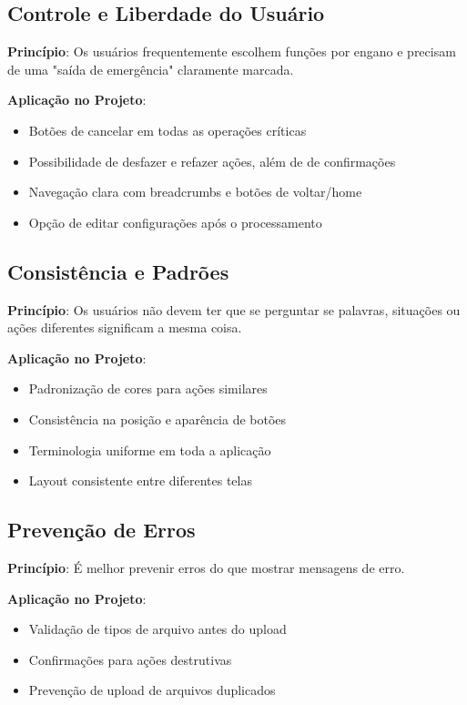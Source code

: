 \subsection{Controle e Liberdade do Usuário}

\textbf{Princípio}: Os usuários frequentemente escolhem funções por engano e precisam de uma "saída de emergência" claramente marcada.

\textbf{Aplicação no Projeto}:
\begin{itemize}
    \item Botões de cancelar em todas as operações críticas
    \item Possibilidade de desfazer e refazer ações, além de de confirmações
    \item Navegação clara com breadcrumbs e botões de voltar/home
    \item Opção de editar configurações após o processamento
\end{itemize}

\subsection{Consistência e Padrões}

\textbf{Princípio}: Os usuários não devem ter que se perguntar se palavras, situações ou ações diferentes significam a mesma coisa.

\textbf{Aplicação no Projeto}:
\begin{itemize}
    \item Padronização de cores para ações similares
    \item Consistência na posição e aparência de botões
    \item Terminologia uniforme em toda a aplicação
    \item Layout consistente entre diferentes telas
\end{itemize}

\subsection{Prevenção de Erros}

\textbf{Princípio}: É melhor prevenir erros do que mostrar mensagens de erro.

\textbf{Aplicação no Projeto}:
\begin{itemize}
    \item Validação de tipos de arquivo antes do upload
    \item Confirmações para ações destrutivas
    \item Prevenção de upload de arquivos duplicados
\end{itemize}

